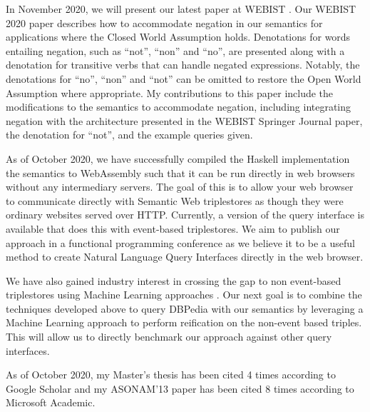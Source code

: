 \documentclass[../main.tex]{subfiles}
\begin{document}
\begin{refsection}
    In November 2020, we will present our latest paper at WEBIST \cite{peelarfrostwebist2020}.  Our WEBIST 2020 paper describes how to accommodate negation in our semantics for applications where the Closed World Assumption holds.  Denotations for words entailing negation, such as ``not'', ``non'' and ``no'', are presented along with a denotation for transitive verbs that can handle negated expressions.  Notably, the denotations for ``no'', ``non'' and ``not'' can be omitted to restore the Open World Assumption where appropriate.
    My contributions to this paper include the modifications to the semantics to accommodate negation, including integrating negation with the architecture presented in the WEBIST Springer Journal paper, the denotation for ``not'', and the example queries given.

    As of October 2020, we have successfully compiled the Haskell implementation the semantics to WebAssembly such that it can be run directly in web browsers without any intermediary servers.  The goal of this is to allow your web browser to communicate directly with Semantic Web triplestores as though they were ordinary websites served over HTTP.  Currently, a version of the query interface is available that does this with event-based triplestores.  We aim to publish our approach in a functional programming conference as we believe it to be a useful method to create Natural Language Query Interfaces directly in the web browser.

    We have also gained industry interest in crossing the gap to non event-based triplestores using Machine Learning approaches \cite{timbr}.  Our next goal is to combine the techniques developed above to query DBPedia with our semantics by leveraging a Machine Learning approach to perform reification on the non-event based triples.  This will allow us to directly benchmark our approach against other query interfaces.

    As of October 2020, my Master's thesis \cite{peelar2016accommodating} has been cited 4 times according to Google Scholar and my ASONAM'13 paper has been cited 8 times according to Microsoft Academic.



\printbibliography[heading=subbibintoc]
\end{refsection}
\end{document}
